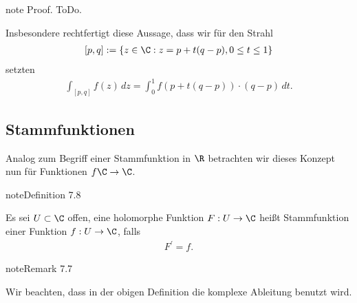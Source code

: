\documentclass[letterpaper,10pt,german]{jupyterBook}
\begin{document}
\begin{sphinxadmonition}{note}
\sphinxAtStartPar
Proof. ToDo.
\end{sphinxadmonition}

\sphinxAtStartPar
Insbesondere rechtfertigt diese Aussage, dass wir für den Strahl
\begin{equation*}
\begin{split}[p,q]:=\{z\in\C: z = p+t(q-p), 0\leq t\leq 1\}\end{split}
\end{equation*}
\sphinxAtStartPar
setzten
\begin{equation*}
\begin{split}\int_{[p,q]} f(z)\, dz = \int_0^1 f(p+t(q-p))\cdot (q-p)\, dt.\end{split}
\end{equation*}

\subsection{Stammfunktionen}
\label{\detokenize{complexanalysis/kurvenintegrale:stammfunktionen}}
\sphinxAtStartPar
Analog zum Begriff einer Stammfunktion in \(\R\) betrachten wir dieses Konzept nun für Funktionen \(f\C\to\C\).
\label{complexanalysis/kurvenintegrale:definition-10}
\begin{sphinxadmonition}{note}{Definition 7.8}



\sphinxAtStartPar
Es sei \(U\subset\C\) offen, eine holomorphe Funktion \(F:U\to\C\) heißt Stammfunktion einer Funktion \(f:U\to\C\), falls
\begin{equation*}
\begin{split}F^\prime = f.\end{split}
\end{equation*}\end{sphinxadmonition}
\label{complexanalysis/kurvenintegrale:remark-11}
\begin{sphinxadmonition}{note}{Remark 7.7}



\sphinxAtStartPar
Wir beachten, dass in der obigen Definition die komplexe Ableitung benutzt wird.
\end{sphinxadmonition}
\end{document}
